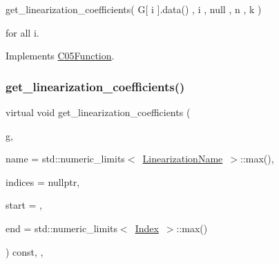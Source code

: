 get\+\_\+linearization\+\_\+coefficients( G\mbox{[} i \mbox{]}.data() , i , null , n , k )

for all i. 

Implements \mbox{\hyperlink{class_s_m_spp__di__unipi__it_1_1_c05_function_a6fa70047dc8b3d43a3ed44f1859a7239}{C05\+Function}}.

\mbox{\label{class_s_m_spp__di__unipi__it_1_1_linear_function_aae9db96155b8cfd53076622b83922cd0}} 
\subsubsection{\texorpdfstring{get\+\_\+linearization\+\_\+coefficients()}{get\_linearization\_coefficients()}\hspace{0.1cm}{\footnotesize\ttfamily [4/4]}}
{\footnotesize\ttfamily virtual void get\+\_\+linearization\+\_\+coefficients (\begin{DoxyParamCaption}\item[{\mbox{\hyperlink{class_s_m_spp__di__unipi__it_1_1_c05_function_a58afb1e1fdc931abd7129be4f92b1f61}{Sparse\+Vector}} \&}]{g,  }\item[{const \mbox{\hyperlink{class_s_m_spp__di__unipi__it_1_1_c05_function_ae90bf93c6d4b4ada66791c735d1c03cc}{Linearization\+Name}}}]{name = {\ttfamily std\+:\+:numeric\+\_\+limits$<$~\mbox{\hyperlink{class_s_m_spp__di__unipi__it_1_1_c05_function_ae90bf93c6d4b4ada66791c735d1c03cc}{Linearization\+Name}}~$>$\+:\+:max()},  }\item[{\mbox{\hyperlink{group___thin_var_dep_interface___c_l_a_s_s_e_s_ga03461123d4f6090aefeb97ef653d3f2b}{c\+\_\+\+Vec\+\_\+\+Index}} $\ast$const}]{indices = {\ttfamily nullptr},  }\item[{\mbox{\hyperlink{group___thin_var_dep_interface___c_l_a_s_s_e_s_gaee6156e2ce80720d57a082d80f39d8cc}{c\+\_\+\+Index}}}]{start = {},  }\item[{\mbox{\hyperlink{group___thin_var_dep_interface___c_l_a_s_s_e_s_gaee6156e2ce80720d57a082d80f39d8cc}{c\+\_\+\+Index}}}]{end = {\ttfamily std\+:\+:numeric\+\_\+limits$<$~\mbox{\hyperlink{group___thin_var_dep_interface___c_l_a_s_s_e_s_gad53d6229d7ec28555a9c9c2fd9abf773}{Index}}~$>$\+:\+:max()} }\end{DoxyParamCaption}) const\hspace{0.3cm}{\ttfamily [final]}, {\ttfamily [override]}, {\ttfamily [virtual]}}



